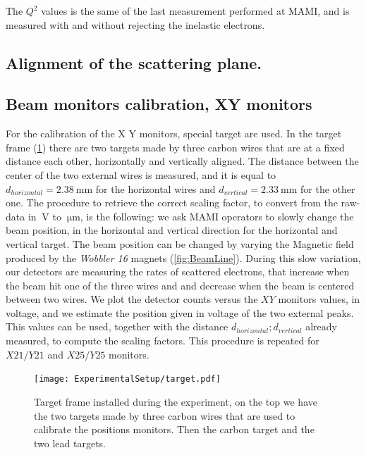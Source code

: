 The $Q^{2}$ values is the same of the last measurement performed at MAMI, and is measured with and without rejecting the inelastic electrons. 

\subsection{Alignment of the scattering plane.}

\subsection{Beam monitors calibration, XY monitors}

For the calibration of the X Y monitors, special target are used. In the target frame (\ref{fig:targetFrame}) there are two targets made by three carbon wires that are at a fixed distance each other, horizontally and vertically aligned. The distance between the center of the two external wires is measured, and it is equal to $ d_{horizontal} = \SI{2.38}{\milli \meter}$ for the horizontal wires and $d_{vertical} = \SI{2.33}{\milli \meter}$ for the other one.
The procedure to retrieve the correct scaling factor, to convert from the raw-data in $\SI{}{\volt}$ to $\SI{}{\micro \meter}$, is the following: we ask MAMI operators to slowly change the beam position, in the horizontal and vertical direction for the horizontal and vertical target. The beam position can be changed by varying the Magnetic field produced by the \textit{Wobbler 16} magnets (\ref{fig:BeamLine}). 
During this slow variation, our detectors are measuring the rates of scattered electrons, that increase when the beam hit one of the three wires and and decrease when the beam is centered between two wires. We plot the detector counts versus the $XY$ monitors values, in voltage, and we estimate the position given in voltage of the two external peaks. This values can be used, together with the distance $d_{horizontal};d_{vertical}$ already measured, to compute the scaling factors. This procedure is repeated for $X21/Y21$ and $X25/Y25$ monitors.


\begin{figure}[htb]
\centering
\texttt{[image: ExperimentalSetup/target.pdf]}
\caption{Target frame installed during the experiment, on the top we have the two targets made by three carbon wires that are used to calibrate the positions monitors. Then the carbon target and the two lead targets.}
\label{fig:targetFrame}
\end{figure}

